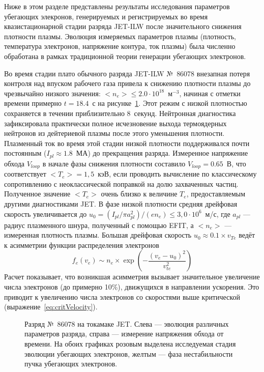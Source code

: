 Ниже в этом разделе представлены результаты исследования параметров убегающих элекронов, генерируемых и регистрируемых во время квазистационарной стадии разряда JET-ILW после значительного снижения плотности плазмы. Эволюция измеряемых параметров плазмы (плотность, температура электронов, напряжение контура, ток плазмы) была численно обработана в рамках традиционной теории генерации убегающих электронов.~\cite{Plyusnin2015}

Во время стадии плато обычного разряда JET-ILW №~86078 внезапная потеря контроля над впуском рабочего газа привела к снижению плотности плазмы до чрезвычайно низкого значения: $ < n_e > \le 2.0\cdot10^{18}$~м${}^{-3}$, начиная с отметки времени примерно $t = 18.4$~с на рисунке~\ref{fig:jetPulseParams86078}. Этот режим с низкой плотностью сохраняется в течении приблизительно 8~секунд. Нейтронная диагностика зафиксировала практически полное исчезновение выхода термоядерных нейтронов из дейтериевой плазмы после этого уменьшения плотности. Плазменный ток во время этой стадии низкой плотности поддерживался почти постоянным ($I_{pl} \approx 1.8$~МА) до прекращения разряда. Измеренное напряжение обхода $V_{loop}$ в начале фазы снижения плотности составило $V_{loop} = 0.65$~В, что соответствует $<T_e> = 1,5$~кэВ, если проводить вычисление по классическому сопротивлению с неоклассической поправкой на долю захваченных частиц.~\cite{Plyusnin2015} Полученное значение $<T_e>$ очень близко к величине $T_e$, предоставляемым другими диагностиками JET. В фазе низкой плотности средняя дрейфовая скорость увеличивается до $u_0 = (I_{pl}/\pi a_{pl}^2 )/(e n_e) \le 3,0\cdot10^6$~м/с, где $a_{pl}$ --- радиус плазменного шнура, полученный с помощью EFIT, а $<n_e>$ --- измеренная плотность плазмы. Большая дрейфовая скорость $u_0 \approx 0.1 \times v_{Te}$ ведёт к асимметрии функции распределения электронов 
\begin{equation*}
  f_e(v_e) \sim n_e \times \exp \left( -\frac{ ( v_e - u_0 )^2 }{ v_{te}^2 } \right)
\end{equation*}
Расчет показывает, что возникшая асимметрия вызывает значительное увеличение числа электронов (до примерно 10\%), движущихся в направлении ускорения. Это приводит к увеличению числа электронов со скоростями выше критической (выражение~\ref{eq:critVelocity}).

\begin{figure}[ht!]
  \caption{ Разряд №~86078 на токамаке JET. Слева --- эволюция различных параметров разряда, справа --- измерение напряжения обхода от времени. На обоих графиках розовым  выделена исследуемая стадия эволюции убегающих электронов, желтым --- фаза нестабильности пучка убегающих электронов.~\cite{Plyusnin2015} }
  \label{fig:jetPulseParams86078}
\end{figure}

